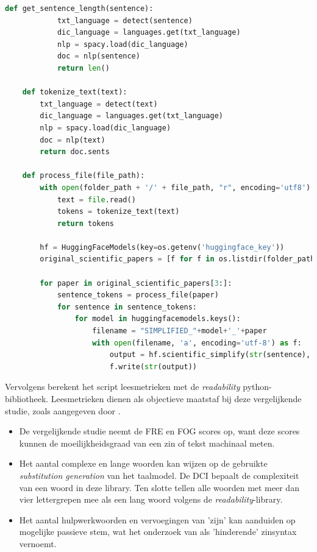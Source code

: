 \begin{center}
\begin{lstlisting}[language=Python, caption={Script voor de derde fase van de vergelijkende studie}, label={code:verg-studie-phase-3}]
	def get_sentence_length(sentence):
			txt_language = detect(sentence)
			dic_language = languages.get(txt_language)
			nlp = spacy.load(dic_language)
			doc = nlp(sentence)
			return len()	
			
	def tokenize_text(text):
		txt_language = detect(text)
		dic_language = languages.get(txt_language)
		nlp = spacy.load(dic_language)
		doc = nlp(text)
		return doc.sents
					
	def process_file(file_path):
		with open(folder_path + '/' + file_path, "r", encoding='utf8') as file:
			text = file.read()
			tokens = tokenize_text(text)
			return tokens
				
		hf = HuggingFaceModels(key=os.getenv('huggingface_key'))
		original_scientific_papers = [f for f in os.listdir(folder_path)]
		
		for paper in original_scientific_papers[3:]:
			sentence_tokens = process_file(paper) 
			for sentence in sentence_tokens:
				for model in huggingfacemodels.keys():
					filename = "SIMPLIFIED_"+model+'_'+paper
					with open(filename, 'a', encoding='utf-8') as f:
						output = hf.scientific_simplify(str(sentence), model)
						f.write(str(output)) 	
	\end{lstlisting}
\end{center}

Vervolgens berekent het script leesmetrieken met de \textit{readability} python-bibliotheek. Leesmetrieken dienen als objectieve maatstaf bij deze vergelijkende studie, zoals aangegeven door \textcite{Nenkova2004}. 

\begin{itemize}
	\item De vergelijkende studie neemt de FRE en FOG scores op, want deze scores kunnen de moeilijkheidsgraad van een zin of tekst machinaal meten.
	\item Het aantal complexe en lange woorden kan wijzen op de gebruikte \textit{substitution generation} van het taalmodel. De DCI bepaalt de complexiteit van een woord in deze library. Ten slotte tellen alle woorden met meer dan vier lettergrepen mee als een lang woord volgens de \textit{readability}-library.
	\item Het aantal hulpwerkwoorden en vervoegingen van 'zijn' kan aanduiden op mogelijke passieve stem, wat het onderzoek van \textcite{Ruelas2020} als 'hinderende' zinsyntax vernoemt.
\end{itemize}

